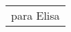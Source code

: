 \cleardoublepage
\thispagestyle{empty}
\vspace*{10em}%
\begin{flushright}
	\large
	\begin{tabular}[t]{l}
		
		para Elisa
		
	\end{tabular}
\end{flushright}
\cleardoublepage
